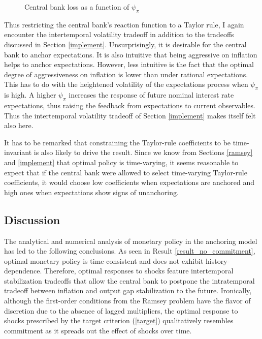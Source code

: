 \documentclass[11pt]{article}
\def \myFigPath {../../figures/}
\renewcommand{\[}{\begin{equation}}
\renewcommand{\]}{\end{equation}}
\def\fignameCBlossnilnil{plot_sim_loss_approx_pretty_losses_again_critsmooth_constant_only_pi_only_params_psi_pi_1_5_psi_x_0_gbar_0_145_lamx_0_lami_0_2020_07_29}
\def\fignameCBlossonenil{plot_sim_loss_approx_pretty_losses_again_critsmooth_constant_only_pi_only_params_psi_pi_1_5_psi_x_0_gbar_0_145_lamx_1_lami_0_2020_07_29}
\def\fignameCBlossnilone{plot_sim_loss_approx_pretty_losses_again_critsmooth_constant_only_pi_only_params_psi_pi_1_5_psi_x_0_gbar_0_145_lamx_0_lami_1_2020_07_29}
\def\fignameCBlossoneone{plot_sim_loss_approx_pretty_losses_again_critsmooth_constant_only_pi_only_params_psi_pi_1_5_psi_x_0_gbar_0_145_lamx_1_lami_1_2020_07_29}
\begin{document}
\begin{figure}[h!]
\hfill
{}
\hfill
{}
\caption{Central bank loss as a function of $\psi_{\pi}$}
\label{fig_loss}
\end{figure}

Thus restricting the central bank's reaction function to a Taylor rule, I again encounter the intertemporal volatility tradeoff in addition to the tradeoffs discussed in Section \ref{implement}. Unsurprisingly, it is desirable for the central bank to anchor expectations. It is also intuitive that being aggressive on inflation helps to anchor expectations. However, less intuitive is the fact that the optimal degree of aggressiveness on inflation is lower than under rational expectations. This has to do with the heightened volatility of the expectations process when $\psi_{\pi}$ is high. A higher $\psi_{\pi}$ increases the response of future nominal interest rate expectations, thus raising the feedback from expectations to current observables. Thus the intertemporal volatility tradeoff of Section \ref{implement} makes itself felt also here.

It has to be remarked that constraining the Taylor-rule coefficients to be time-invariant is also likely to drive the result. Since we know from Sections \ref{ramsey} and \ref{implement} that optimal policy is time-varying, it seems reasonable to expect that if the central bank were allowed to select time-varying Taylor-rule coefficients, it would choose low coefficients when expectations are anchored and high ones when expectations show signs of unanchoring. 

\subsection{Discussion}\label{discussion_results}

The analytical and numerical analysis of monetary policy in the anchoring model has led to the following conclusions. As seen in Result \ref{result_no_commitment}, optimal monetary policy is time-consistent and does not exhibit history-dependence. Therefore, optimal responses to shocks feature intertemporal stabilization tradeoffs that allow the central bank to postpone the intratemporal tradeoff between inflation and output gap stabilization to the future. Ironically, although the first-order conditions from the Ramsey problem have the flavor of discretion due to the absence of lagged multipliers, the optimal response to shocks prescribed by the target criterion (\ref{target}) qualitatively resembles commitment as it spreads out the effect of shocks over time. 
\end{document}
